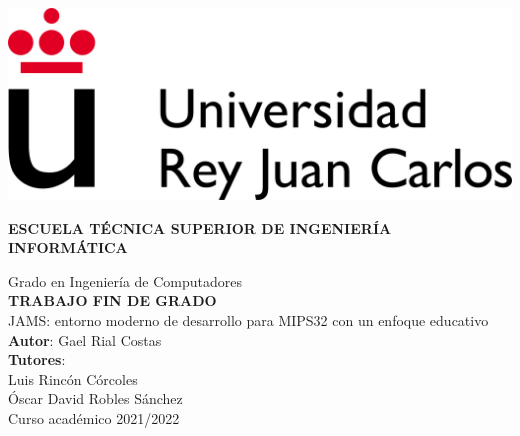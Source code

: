 \thispagestyle{empty}

\includegraphics{images/URJC_logo}
\vspace{2cm}

\begin{center}
	\large{\textbf{ESCUELA TÉCNICA SUPERIOR DE INGENIERÍA INFORMÁTICA}}
	\vspace{5mm}

 	{\Large {Grado en Ingeniería de Computadores}}
    \\
  	\vspace{34mm}
	{\large {\bf TRABAJO FIN DE GRADO}}
  	\vspace{10mm}
    \\
  	{\Large {{\Huge {
  		JAMS: entorno moderno de desarrollo para MIPS32 con un enfoque educativo
	}} \\[1cm] }}
  	\vspace{2cm}
	{\large {
        \textbf{Autor}: Gael Rial Costas\\
        \textbf{Tutores}:\\
        Luis Rincón Córcoles\\
        Óscar David Robles Sánchez\\
  	}}
	\vspace{10mm}
  	{\large {Curso académico 2021/2022}}
  	\vspace{1cm}
\end{center}
